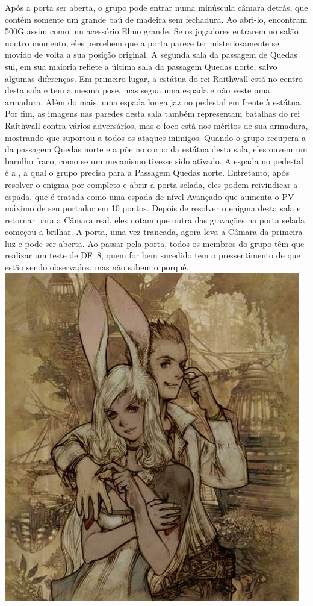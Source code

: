 Após a porta ser aberta, o grupo pode entrar numa minúscula câmara detrás, que contém somente um grande baú de madeira sem fechadura.
Ao abri-lo, encontram 500G assim como um acessório Elmo grande. Se os jogadores entrarem no salão noutro momento, eles percebem que a porta parece ter misteriosamente se movido de volta a sua posição original.
%
\ofpar
%
A segunda sala da passagem de Quedas sul, em sua maioria reflete a última sala da passagem Quedas norte, salvo algumas diferenças.
Em primeiro lugar, a estátua do rei Raithwall está no centro desta sala e tem a mesma pose, mas segua uma espada e não veste uma armadura.
Além do mais, uma espada longa jaz no pedestal em frente à estátua.
Por fim, as imagens nas paredes desta sala também representam batalhas do rei Raithwall contra vários adversários, mas o foco está nos méritos de sua armadura, mostrando que suportou a todos os ataques inimigos.
Quando o grupo recupera a  da passagem Quedas norte e a põe no corpo da estátua desta sala, eles ouvem um barulho fraco, como se um mecanismo tivesse sido ativado.
A espada no pedestal é a , a qual o grupo precisa para a Passagem Quedas norte.
Entretanto, após resolver o enigma por completo e abrir a porta selada, eles podem reivindicar a espada, que é tratada como uma espada de nível Avançado que aumenta o PV máximo de seu portador em 10 pontos.
%
\ofpar
%
Depois de resolver o enigma desta sala e retornar para a Câmara real, eles notam que outra das gravações na porta selada começou a brilhar.
A porta, uma vez trancada, agora leva a Câmara da primeira luz e pode ser aberta.
Ao passar pela porta, todos os membros do grupo têm que realizar um teste de DF~8, quem for bem sucedido tem o pressentimento de que estão sendo observados, mas não sabem o porquê.
%
\vfill
%
\includegraphics[width=\columnwidth]{./art/tombofraithwall/franandbalthier.jpg}
